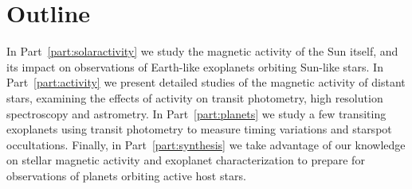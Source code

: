 \section{Outline}

In Part~\ref{part:solaractivity} we study the magnetic activity of the Sun itself, and its impact on observations of Earth-like exoplanets orbiting Sun-like stars. In Part~\ref{part:activity} we present detailed studies of the magnetic activity of distant stars, examining the effects of activity on transit photometry, high resolution spectroscopy and astrometry. In Part~\ref{part:planets} we study a few transiting exoplanets using transit photometry to measure timing variations and starspot occultations. Finally, in Part~\ref{part:synthesis} we take advantage of our knowledge on stellar magnetic activity and exoplanet characterization to prepare for observations of planets orbiting active host stars. 
